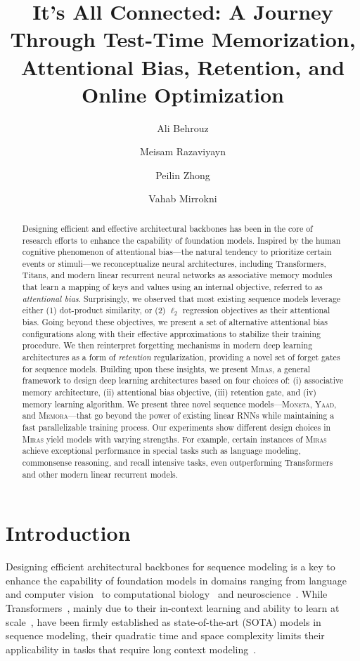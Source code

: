 \documentclass{article}
\title{\textcolor{c2}{It's All Connected}: A Journey Through Test-Time Memorization, Attentional Bias, Retention, and Online Optimization}
\author[$^\dagger$]{Ali Behrouz}
\author[$^\dagger$]{Meisam Razaviyayn}
\author[$^\dagger$]{Peilin Zhong}
\author[$^\dagger$]{Vahab Mirrokni}
\affil[$^\dagger$]{Google Research}
\affil[ ]{{\small \texttt{\{alibehrouz, razaviyayn, peilinz, mirrokni\}@google.com}}}
\date{}
\newcommand{\citep}{\parencite}
\newcommand{\framework}[0]{\textsc{Miras}}
\newcommand{\ymodel}[0]{\textsc{Yaad}}
\newcommand{\mmodel}[0]{\textsc{Moneta}}
\newcommand{\xmodel}[0]{\textsc{Memora}}
\theoremstyle{plain}
\theoremstyle{definition}
\theoremstyle{remark}
\begin{document}
\maketitle

\begin{abstract}
Designing efficient and effective architectural backbones has been in the core of research efforts to enhance the capability of foundation models. Inspired by the human cognitive phenomenon of attentional bias—the natural tendency to prioritize certain events or stimuli—we reconceptualize neural architectures, including Transformers, Titans, and modern linear recurrent neural networks as associative memory modules that learn a mapping of keys and values using an internal objective, referred to as \emph{attentional bias}. Surprisingly, we observed that most existing sequence models leverage either (1) dot-product similarity, or (2) $\ell_2$ regression objectives as their attentional bias. Going beyond these  objectives, we present a set of alternative attentional bias configurations along with their effective approximations to stabilize their training procedure. We then reinterpret forgetting mechanisms in modern deep learning architectures as a form of \emph{retention} regularization, providing a novel set of forget gates for sequence models. Building upon these insights, we present \framework{}, a general framework to design deep learning architectures based on four choices of: (i) associative memory architecture, (ii) attentional bias objective, (iii) retention gate, and (iv) memory learning algorithm. We present three novel sequence models—\mmodel, \ymodel, and \xmodel—that go beyond the power of existing linear RNNs while maintaining a fast parallelizable training process. Our experiments show different design choices in \framework{} yield models with varying strengths. 
 For example, certain  instances of \framework{} achieve exceptional performance in special tasks such as language modeling, commonsense reasoning, and recall intensive tasks, even outperforming Transformers and other modern linear recurrent models. 
\end{abstract}

\section{Introduction}\label{sec:intro}
Designing efficient architectural backbones for sequence modeling is a key to enhance the capability of foundation models in domains ranging from language~\citep{Vaswani+2017, behrouz2024titans} and computer vision~\citep{dosovitskiy2020image} to computational biology~\citep{wang2024long} and neuroscience~\citep{behrouz2024unsupervised}. While Transformers~\citep{Vaswani+2017}, mainly due to their in-context learning and ability to learn at scale~\citep{kaplan2020scaling}, have been firmly established as state-of-the-art (SOTA) models in sequence modeling, their quadratic time and space complexity limits their applicability in tasks that require long context modeling~\citep{dalal2025one, liu2024lost, li2024survey}. 
\end{document}
